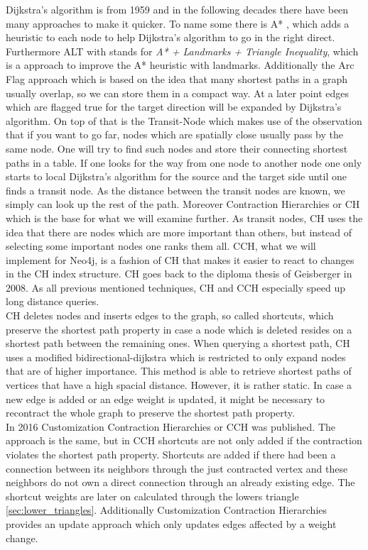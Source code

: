 Dijkstra's algorithm  is from 1959 and in the following decades there have been many approaches to make it quicker.
To name some there is A* \cite{A_Star}, which adds a heuristic to each node to help Dijkstra's algorithm to go in the right direct.
Furthermore ALT \cite{ALT} with stands for \textit{A* + Landmarks + Triangle Inequality}, which is a approach to improve the A* heuristic with landmarks.
Additionally the Arc Flag \cite{ARC_FLAG} approach which is based on the idea that many shortest paths in a graph usually overlap, so we can store them in a compact way.
At a later point edges which are flagged true for the target direction will be expanded by Dijkstra's algorithm.
On top of that is the Transit-Node \cite{Bast_2007} which makes use of the observation that if you want to go far, nodes which are spatially close usually pass by the same node.
One will try to find such nodes and store their connecting shortest paths in a table.
If one looks for the way from one node to another node one only starts to local Dijkstra's algorithm for the source and the target side until one finds a transit node.
As the distance between the transit nodes are known, we simply can look up the rest of the path.
Moreover Contraction Hierarchies \cite{Geisberger_2012} or CH which is the base for what we will examine further.
As transit nodes, CH uses the idea that there are nodes which are more important than others, but instead of selecting some important nodes one ranks them all.
CCH, what we will implement for Neo4j, is a fashion of CH that makes it easier to react to changes in the CH index structure.
CH goes back to the diploma thesis of Geisberger \cite{Geisberger} in 2008.
As all previous mentioned techniques, CH and CCH especially speed up long distance queries.
\\ 
CH deletes nodes and inserts edges to the graph, so called shortcuts, which preserve the shortest path property in case a node which is deleted resides on a shortest path between the remaining ones.
When querying a shortest path, CH uses a modified bidirectional-dijkstra which is restricted to only expand nodes that are of higher importance.
This method is able to retrieve shortest paths of vertices that have a high spacial distance.
However, it is rather static.
In case a new edge is added or an edge weight is updated, it might be necessary to recontract the whole graph to preserve the shortest path property.
\\
In 2016 Customization Contraction Hierarchies \cite{CCH} or CCH was published.
The approach is the same, but in CCH shortcuts are not only added if the contraction violates the shortest path property.
Shortcuts are added if there had been a connection between its neighbors through the just contracted vertex and these neighbors do not own a direct connection through an already existing edge.
The shortcut weights are later on calculated through the lowers triangle \ref{sec:lower_triangles}.
Additionally Customization Contraction Hierarchies \cite{CCH} provides an update approach which only updates edges affected by a weight change.

